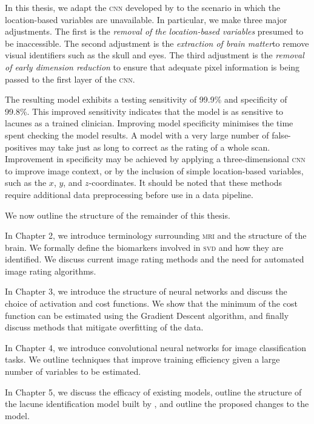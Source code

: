 In this thesis, we adapt the \textsc{cnn} developed by \cite{GhafoorianM.2017Dml3} to the scenario in which the location-based variables are unavailable. In particular, we make three major adjustments. The first is the \textit{removal of the location-based variables} presumed to be inaccessible. The second adjustment is the \textit{extraction of brain matter}to remove visual identifiers such as the skull and eyes. The third adjustment is the \textit{removal of early dimension reduction} to ensure that adequate pixel information is being passed to the first layer of the \textsc{cnn}.

The resulting model exhibits a testing sensitivity of 99.9\% and specificity of 99.8\%. This improved sensitivity indicates that the model is as sensitive to lacunes as a trained clinician. Improving model specificity minimises the time spent checking the model results. A model with a very large number of false-positives may take just as long to correct as the rating of a whole scan. Improvement in specificity may be achieved by applying a three-dimensional \textsc{cnn} to improve image context, or by the inclusion of simple location-based variables, such as the $x$, $y$, and $z$-coordinates. It should be noted that these methods require additional data preprocessing before use in a data pipeline.


We now outline the structure of the remainder of this thesis.

In Chapter 2, we introduce terminology surrounding \textsc{mri} and the structure of the brain. We formally define the biomarkers involved in \textsc{svd} and how they are identified. We discuss current image rating methods and the need for automated image rating algorithms.

In Chapter 3, we introduce the structure of neural networks and discuss the choice of activation and cost functions. We show that the minimum of the cost function can be estimated using the Gradient Descent algorithm, and finally discuss methods that mitigate overfitting of the data.

In Chapter 4, we introduce convolutional neural networks for image classification tasks. We outline techniques that improve training efficiency given a large number of variables to be estimated.

In Chapter 5, we discuss the efficacy of existing models, outline the structure of the lacune identification model built by \cite{GhafoorianM.2017Dml3}, and outline the proposed changes to the model.

